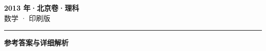 \documentclass[zihao=5, a4paper]{ctexart}
\begin{document}
\begin{center}
  {\Large\bfseries 2013 年·北京卷·理科}\\[4pt]
  {\large 数学 · 印刷版}
\end{center}
\medskip
{}

\par\bigskip\hrule\bigskip
{}
\Needspace{0.55\textheight}
\begin{center}{\large\bfseries 参考答案与详细解析}\end{center}
\smallskip

\end{document}
